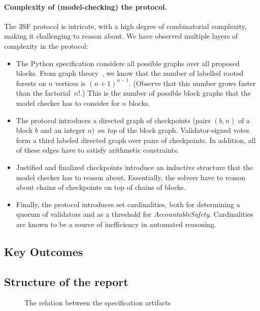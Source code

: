 \paragraph{Complexity of (model-checking) the protocol.} The 3SF protocol is
intricate, with a high degree of combinatorial complexity, making it challenging
to reason about. We have observed multiple layers of complexity in the protocol:
\begin{itemize}
  \item The Python specification considers all possible graphs over all proposed
    blocks. From graph theory~\cite{cayley1878theorem}, we know that the number
    of labelled rooted forests on $n$ vertices is ${(n+1)}^{n-1}$. (Observe that
    this number grows faster than the factorial~$n!$.) This is the number of
    possible block graphs that the model checker has to consider for $n$ blocks.
  \item The protocol introduces a directed graph of checkpoints (pairs $(b,n)$
    of a block $b$ and an integer $n$) \emph{on top} of the block graph.
    Validator-signed votes form a third labeled directed graph over pairs of
    checkpoints. In addition, all of these edges have to satisfy arithmetic
    constraints.
  \item Justified and finalized checkpoints introduce an inductive structure
    that the model checker has to reason about. Essentially, the solvers have to
    reason about chains of checkpoints on top of chains of blocks.
  \item Finally, the protocol introduces set cardinalities, both for determining a
    quorum of validators and as a threshold for \textit{AccountableSafety}.
    Cardinalities are known to be a source of inefficiency in automated
    reasoning.
\end{itemize}

\subsection{Key Outcomes}\label{sec:discussion}



\subsection{Structure of the report}

\begin{figure}
  
  \caption{The relation between the specification artifacts}\label{fig:artifacts}
\end{figure}

